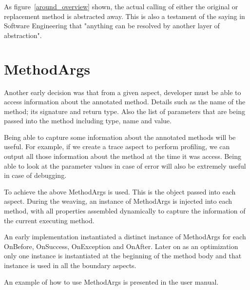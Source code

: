 As figure~\ref{around_overview} shown, the actual calling of either the original or replacement method is abstracted away. This is also a testament of the saying in Software Engineering that "anything can be resolved by another layer of abstraction".

\section{MethodArgs}

Another early decision was that from a given aspect, developer must be able to access information about the annotated method. Details such as the name of the method; its signature and return type. Also the list of parameters that are being passed into the method including type, name and value.

Being able to capture some information about the annotated methods will be useful. For example, if we create a trace aspect to perform profiling, we can output all those information about the method at the time it was access. Being able to look at the parameter values in case of error will also be extremely useful in case of debugging.

To achieve the above MethodArgs is used. This is the object passed into each aspect. During the weaving, an instance of MethodArgs is injected into each method, with all properties assembled dynamically to capture the information of the current executing method.

An early implementation instantiated a distinct instance of MethodArgs for each OnBefore, OnSuccess, OnException and OnAfter. Later on as an optimization only one instance is instantiated at the beginning of the method body and that instance is used in all the boundary aspects.

An example of how to use MethodArgs is presented in the user manual.
%



%
